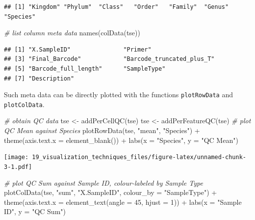 \documentclass[
]{book}
\newenvironment{Shaded}{\begin{snugshade}}{\end{snugshade}}
\newcommand{\AttributeTok}[1]{\textcolor[rgb]{0.77,0.63,0.00}{#1}}
\newcommand{\CommentTok}[1]{\textcolor[rgb]{0.56,0.35,0.01}{\textit{#1}}}
\newcommand{\DecValTok}[1]{\textcolor[rgb]{0.00,0.00,0.81}{#1}}
\newcommand{\FunctionTok}[1]{\textcolor[rgb]{0.00,0.00,0.00}{#1}}
\newcommand{\NormalTok}[1]{#1}
\newcommand{\OtherTok}[1]{\textcolor[rgb]{0.56,0.35,0.01}{#1}}
\newcommand{\SpecialCharTok}[1]{\textcolor[rgb]{0.00,0.00,0.00}{#1}}
\newcommand{\StringTok}[1]{\textcolor[rgb]{0.31,0.60,0.02}{#1}}
\begin{document}
\begin{verbatim}
## [1] "Kingdom" "Phylum"  "Class"   "Order"   "Family"  "Genus"   "Species"
\end{verbatim}

\begin{Shaded}
\begin{Highlighting}[]
\CommentTok{\# list column meta data}
\FunctionTok{names}\NormalTok{(}\FunctionTok{colData}\NormalTok{(tse))}
\end{Highlighting}
\end{Shaded}

\begin{verbatim}
## [1] "X.SampleID"               "Primer"                  
## [3] "Final_Barcode"            "Barcode_truncated_plus_T"
## [5] "Barcode_full_length"      "SampleType"              
## [7] "Description"
\end{verbatim}

Such meta data can be directly plotted with the functions \texttt{plotRowData} and \texttt{plotColData}.

\begin{Shaded}
\begin{Highlighting}[]
\CommentTok{\# obtain QC data}
\NormalTok{tse }\OtherTok{\textless{}{-}} \FunctionTok{addPerCellQC}\NormalTok{(tse)}
\NormalTok{tse }\OtherTok{\textless{}{-}} \FunctionTok{addPerFeatureQC}\NormalTok{(tse)}
\CommentTok{\# plot QC Mean against Species}
\FunctionTok{plotRowData}\NormalTok{(tse, }\StringTok{"mean"}\NormalTok{, }\StringTok{"Species"}\NormalTok{) }\SpecialCharTok{+}
  \FunctionTok{theme}\NormalTok{(}\AttributeTok{axis.text.x =} \FunctionTok{element\_blank}\NormalTok{()) }\SpecialCharTok{+}
  \FunctionTok{labs}\NormalTok{(}\AttributeTok{x =} \StringTok{"Species"}\NormalTok{, }\AttributeTok{y =} \StringTok{"QC Mean"}\NormalTok{)}
\end{Highlighting}
\end{Shaded}

\texttt{[image: 19\_visualization\_techniques\_files/figure-latex/unnamed-chunk-3-1.pdf]}

\begin{Shaded}
\begin{Highlighting}[]
\CommentTok{\# plot QC Sum against Sample ID, colour{-}labeled by Sample Type}
\FunctionTok{plotColData}\NormalTok{(tse, }\StringTok{"sum"}\NormalTok{, }\StringTok{"X.SampleID"}\NormalTok{, }\AttributeTok{colour\_by =} \StringTok{"SampleType"}\NormalTok{) }\SpecialCharTok{+}
  \FunctionTok{theme}\NormalTok{(}\AttributeTok{axis.text.x =} \FunctionTok{element\_text}\NormalTok{(}\AttributeTok{angle =} \DecValTok{45}\NormalTok{, }\AttributeTok{hjust =} \DecValTok{1}\NormalTok{)) }\SpecialCharTok{+}
  \FunctionTok{labs}\NormalTok{(}\AttributeTok{x =} \StringTok{"Sample ID"}\NormalTok{, }\AttributeTok{y =} \StringTok{"QC Sum"}\NormalTok{)}
\end{Highlighting}
\end{Shaded}
\end{document}
